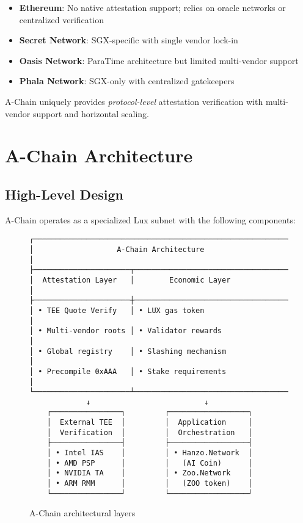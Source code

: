 \documentclass[11pt,a4paper]{article}
\begin{document}
\begin{itemize}
\item \textbf{Ethereum}: No native attestation support; relies on oracle networks or centralized verification
\item \textbf{Secret Network}: SGX-specific with single vendor lock-in
\item \textbf{Oasis Network}: ParaTime architecture but limited multi-vendor support
\item \textbf{Phala Network}: SGX-only with centralized gatekeepers
\end{itemize}

A-Chain uniquely provides \textit{protocol-level} attestation verification with multi-vendor support and horizontal scaling.

\section{A-Chain Architecture}

\subsection{High-Level Design}

A-Chain operates as a specialized Lux subnet with the following components:

\begin{figure}[h]
\centering
\begin{verbatim}
┌────────────────────────────────────────────────────────────┐
│                   A-Chain Architecture                      │
├──────────────────────┬─────────────────────────────────────┤
│  Attestation Layer   │        Economic Layer               │
├──────────────────────┼─────────────────────────────────────┤
│ • TEE Quote Verify   │ • LUX gas token                     │
│ • Multi-vendor roots │ • Validator rewards                 │
│ • Global registry    │ • Slashing mechanism                │
│ • Precompile 0xAAA   │ • Stake requirements                │
└──────────────────────┴─────────────────────────────────────┘
             ↓                          ↓
    ┌────────────────┐         ┌──────────────────┐
    │  External TEE  │         │  Application     │
    │  Verification  │         │  Orchestration   │
    ├────────────────┤         ├──────────────────┤
    │ • Intel IAS    │         │ • Hanzo.Network  │
    │ • AMD PSP      │         │   (AI Coin)      │
    │ • NVIDIA TA    │         │ • Zoo.Network    │
    │ • ARM RMM      │         │   (ZOO token)    │
    └────────────────┘         └──────────────────┘
\end{verbatim}
\caption{A-Chain architectural layers}
\end{figure}
\end{document}
